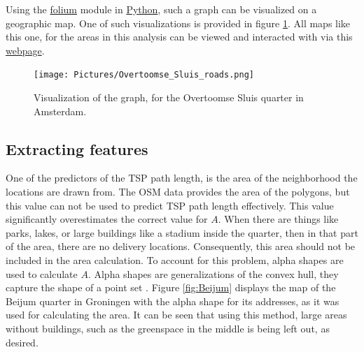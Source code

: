 Using the \url{folium} module in \url{Python}, such a graph can be visualized on a geographic map.
One of such visualizations is provided in figure \ref{fig:overtoomse_sluis}. All maps like this one,
for the areas in this analysis can be viewed and interacted with via this
\href{https://koenstevens.nl/projects/BSc_thesis/maps/}{\url{webpage}}.
\begin{figure}[H]
	\caption{Visualization of the graph, for the Overtoomse Sluis quarter in Amsterdam.}
	\label{fig:overtoomse_sluis}
	\texttt{[image: Pictures/Overtoomse\_Sluis\_roads.png]}
\end{figure}

\subsection{Extracting features}
One of the predictors of the TSP path length, is the area of the neighborhood the locations are drawn from.
The OSM data provides the area of the polygons, but this value can not be used to predict TSP path length effectively.
This value significantly overestimates the correct value for $A$.
When there are things like parks, lakes, or large buildings like a stadium inside the quarter, then in that part of the
area, there are no delivery locations. Consequently, this area should not be included in the area calculation.
To account for this problem, alpha shapes are used to calculate $A$. Alpha shapes are generalizations of the convex hull,
they capture the shape of a point set \citep{akkiraju1995alpha}. Figure \ref{fig:Beijum} displays the map of the Beijum
quarter in Groningen with the alpha shape for its addresses, as it was used for calculating the area. 
It can be seen that using this method, large areas without buildings, such as the greenspace in the middle is being left
out, as desired.
